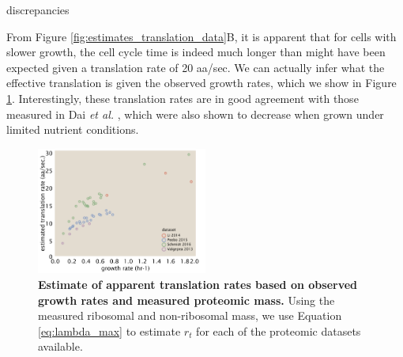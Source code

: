 discrepancies \documentclass[11pt, letterpaper]{article}
\begin{document}
From Figure \ref{fig:estimates_translation_data}B, it is apparent that for cells with
slower growth, the cell cycle time is indeed much longer than might have
been expected given a translation rate of 20 aa/sec. We can actually infer what
the effective translation is given the observed growth rates, which we show
in Figure \ref{fig:estimates_translation_rate}.  Interestingly, these
translation rates are in good agreement with those measured in Dai {\it et al.}
\cite{Dai2016}, which were also shown to decrease when grown under limited nutrient conditions.



\begin{figure}[H]
		\centering
    \includegraphics[width=0.5\textwidth]{../../code/figures/SI/estimates_translation_translation_rate.pdf}
  \caption{{\bf Estimate of apparent translation rates based on observed growth rates and measured proteomic mass.}
	Using the measured ribosomal and non-ribosomal mass, we use Equation \ref{eq:lambda_max}  to estimate $r_t$
	for each of the proteomic datasets available.}
  \label{fig:estimates_translation_rate}
\end{figure}



\end{document}
